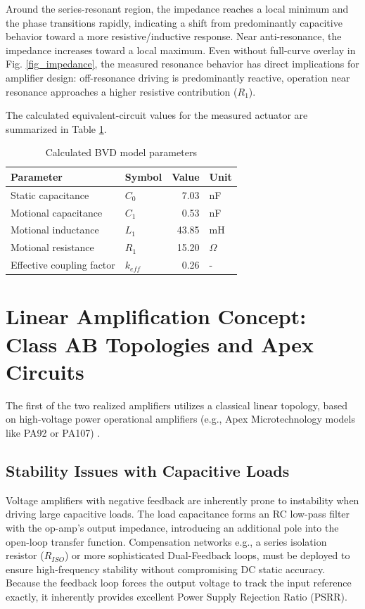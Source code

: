 \documentclass[10pt, conference, letterpaper]{IEEEtran}
\begin{document}
Around the series-resonant region, the impedance reaches a local minimum and the phase transitions rapidly, indicating a shift from predominantly capacitive behavior toward a more resistive/inductive response. Near anti-resonance, the impedance increases toward a local maximum. Even without full-curve overlay in Fig. \ref{fig_impedance}, the measured resonance behavior has direct implications for amplifier design: off-resonance driving is predominantly reactive, operation near resonance approaches a higher resistive contribution ($R_1$).

The calculated equivalent-circuit values for the measured actuator are summarized in Table \ref{tab:bvd_params}.

\begin{table}[htbp]
\centering
\caption{Calculated BVD model parameters}
\label{tab:bvd_params}
\begin{tabular}{@{}llrl@{}}
\toprule
\textbf{Parameter} & \textbf{Symbol} & \textbf{Value} & \textbf{Unit} \\
\midrule
Static capacitance & $C_0$ & 7.03 & nF \\
Motional capacitance & $C_1$ & 0.53 & nF \\
Motional inductance & $L_1$ & 43.85 & mH \\
Motional resistance & $R_1$ & 15.20 & $\Omega$ \\
\midrule
Effective coupling factor & $k_{eff}$ & 0.26 & - \\
\bottomrule
\end{tabular}
\end{table}

\section{Linear Amplification Concept: Class AB Topologies and Apex Circuits}
The first of the two realized amplifiers utilizes a classical linear topology, based on high-voltage power operational amplifiers (e.g., Apex Microtechnology models like PA92 or PA107) \cite{apex_pa92,apex_pa107}.

\subsection{Stability Issues with Capacitive Loads}
Voltage amplifiers with negative feedback are inherently prone to instability when driving large capacitive loads. The load capacitance forms an RC low-pass filter with the op-amp's output impedance, introducing an additional pole into the open-loop transfer function. Compensation networks e.g., a series isolation resistor ($R_{ISO}$) or more sophisticated Dual-Feedback loops, must be deployed to ensure high-frequency stability without compromising DC static accuracy. Because the feedback loop forces the output voltage to track the input reference exactly, it inherently provides excellent Power Supply Rejection Ratio (PSRR).
\end{document}
